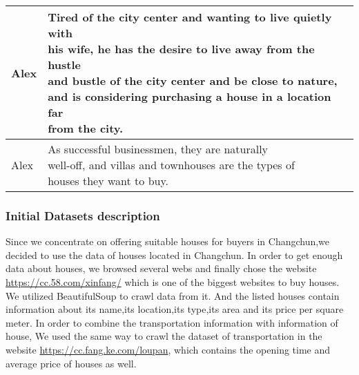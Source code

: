 \begin{table}
\begin{center}
\begin{tabular}{|p{2.3cm}|p{12.1cm}|}
    \hline
    Alex & \tabincell{l}{Tired of the city center and wanting to live quietly with\\ his wife, he has the desire to live away from the hustle\\ and bustle of the city center and be close to nature, \\and is considering purchasing a house in a location far \\from the city.} \\
    \hline
    Alex & \tabincell{l}{As successful businessmen, they are naturally \\well-off, and villas and townhouses are the types of\\ houses they want to buy.} \\
    \hline  
    \end{tabular}
    \end{center}
    \end{table} 
    
    
\subsubsection{Initial Datasets description}
Since we concentrate on offering suitable houses for buyers in Changchun,we decided to use the data of houses located in Changchun. In order to get enough data about houses, we browsed several webs and finally chose the website \url{https://cc.58.com/xinfang/} which is one of the biggest websites to buy houses. We utilized BeautifulSoup to crawl data from it. And the listed houses contain information about its name,its location,its type,its area and its price per square meter. In order to combine the transportation information with information of house, We used the same way to crawl the dataset of transportation in the website \url{https://cc.fang.ke.com/loupan}, which contains the opening time and average price of houses as well.

